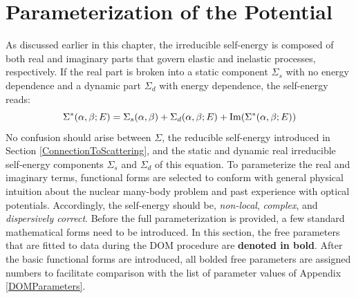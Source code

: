 \section{Parameterization of the Potential} \label{PotentialParameterization}
As discussed earlier in this chapter, the irreducible \gls{self-energy} is composed of both real and
imaginary parts that govern elastic and inelastic processes, respectively. If the real part is
broken into a static component $\Sigma_{s}$ with no energy dependence and a dynamic part
$\Sigma_{d}$ with energy dependence, the self-energy reads:
\begin{equation} \label{SelfEnergyBreakdown}
    \Sigma^{*}(\alpha,\beta;E) =  \Sigma_{s}(\alpha,\beta) + 
    \Sigma_{d}(\alpha,\beta;E) +
    \operatorname{Im}(\Sigma^{*}(\alpha,\beta;E))\\
\end{equation}
No confusion should arise between $\Sigma$, the reducible self-energy introduced in Section
\ref{ConnectionToScattering}, and the static and dynamic real
irreducible self-energy components $\Sigma_{s}$ and $\Sigma_{d}$ of this equation.
To parameterize the real and imaginary terms, functional forms
are selected to conform with general physical intuition about the nuclear
many-body problem and past experience with \gls{optical potential}s. Accordingly,
the self-energy should be, \textit{non-local}, \textit{complex}, and
\textit{dispersively correct}.
Before the full parameterization is provided,
a few standard mathematical forms need to be introduced. In this section, the free parameters that
are fitted to data during the DOM procedure are \textbf{denoted in bold}.
After the basic functional forms are introduced, all bolded
free parameters are assigned numbers to facilitate comparison
with the list of parameter values of Appendix \ref{DOMParameters}.

